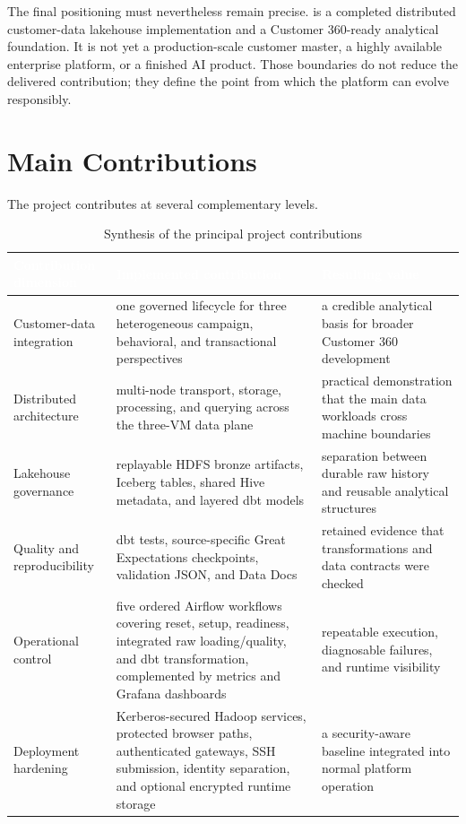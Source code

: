 The final positioning must nevertheless remain precise. \projectname{} is a completed distributed customer-data lakehouse implementation and a Customer 360-ready analytical foundation. It is not yet a production-scale customer master, a highly available enterprise platform, or a finished AI product. Those boundaries do not reduce the delivered contribution; they define the point from which the platform can evolve responsibly.

\section{Main Contributions}
The project contributes at several complementary levels.

\begin{table}[!htbp]
    \centering
    \footnotesize
    \renewcommand{\arraystretch}{1.15}
    \begin{tabularx}{\textwidth}{|L{0.25\textwidth}|Y|Y|}
        \hline
        \textcolor{white}{\textbf{Contribution dimension}} & \textcolor{white}{\textbf{Implemented contribution}} & \textcolor{white}{\textbf{Resulting value}} \\
        \hline
        Customer-data integration & one governed lifecycle for three heterogeneous campaign, behavioral, and transactional perspectives & a credible analytical basis for broader Customer 360 development \\
        \hline
        Distributed architecture & multi-node transport, storage, processing, and querying across the three-VM data plane & practical demonstration that the main data workloads cross machine boundaries \\
        \hline
        Lakehouse governance & replayable HDFS bronze artifacts, Iceberg tables, shared Hive metadata, and layered dbt models & separation between durable raw history and reusable analytical structures \\
        \hline
        Quality and reproducibility & dbt tests, source-specific Great Expectations checkpoints, validation JSON, and Data Docs & retained evidence that transformations and data contracts were checked \\
        \hline
        Operational control & five ordered Airflow workflows covering reset, setup, readiness, integrated raw loading/quality, and dbt transformation, complemented by metrics and Grafana dashboards & repeatable execution, diagnosable failures, and runtime visibility \\
        \hline
        Deployment hardening & Kerberos-secured Hadoop services, protected browser paths, authenticated gateways, SSH submission, identity separation, and optional encrypted runtime storage & a security-aware baseline integrated into normal platform operation \\
        \hline
    \end{tabularx}
    \caption{Synthesis of the principal project contributions}
    \label{tab:chapter10-main-contributions}
\end{table}
\FloatBarrier

